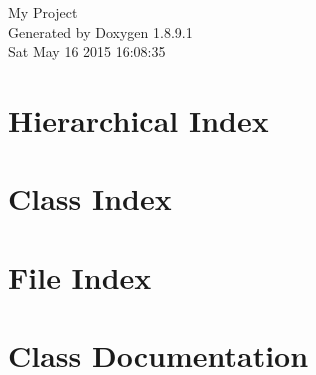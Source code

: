 \documentclass[twoside]{book}
\newcommand{\+}{\discretionary{\mbox{\scriptsize$\hookleftarrow$}}{}{}}
\newcommand{\clearemptydoublepage}{%
  \newpage{\pagestyle{empty}\cleardoublepage}%
}
\begin{document}
\hypersetup{pageanchor=false,
             bookmarks=true,
             bookmarksnumbered=true,
             pdfencoding=unicode
            }
\begin{titlepage}
\vspace*{7cm}
\begin{center}%
{\Large My Project }\\
\vspace*{1cm}
{\large Generated by Doxygen 1.8.9.1}\\
\vspace*{0.5cm}
{\small Sat May 16 2015 16:08:35}\\
\end{center}
\end{titlepage}
\clearemptydoublepage
\tableofcontents
\clearemptydoublepage
{}
\hypersetup{pageanchor=true}

\chapter{Hierarchical Index}

\chapter{Class Index}

\chapter{File Index}

\chapter{Class Documentation}






















\end{document}
